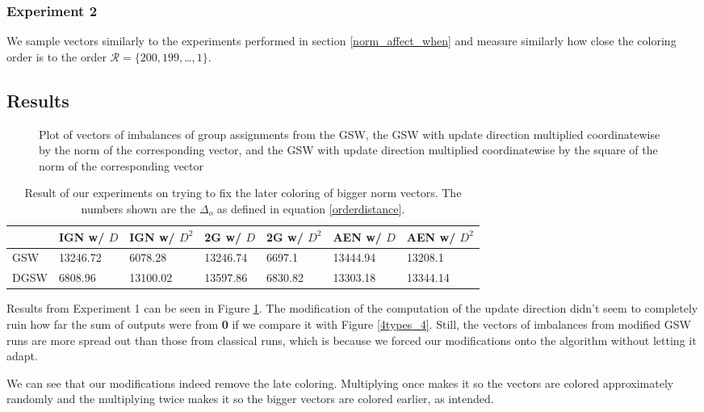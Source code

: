 \documentclass[12pt]{article}
\begin{document}
\subsubsection{Experiment 2}
We sample vectors similarly to the experiments performed in section \ref{norm_affect_when} and measure similarly how close the coloring order is to the order $\mathcal{R}=\{200,199,$\dots$,1\}$.
\subsection{Results}
\begin{figure}[h]

\caption{Plot of vectors of imbalances of group assignments from the GSW, the GSW with update direction multiplied coordinatewise by the norm of the corresponding vector, and the GSW with update direction multiplied coordinatewise by the square of the norm of the corresponding vector}\label{3_types_d_and_i}
\end{figure}

\begin{center}
\begin{table}[h]
\begin{tabular}{l|llllll}
 &IGN w/ $D$&IGN w/ $D^2$& 2G w/ $D$&2G w/ $D^2$& AEN w/ $D$&AEN w/ $D^2$   \\
\hline
GSW&13246.72&6078.28&13246.74&6697.1&13444.94&13208.1\\
DGSW&6808.96&13100.02&13597.86&6830.82&13303.18&13344.14
\end{tabular}
\caption{Result of our experiments on trying to fix the later coloring of bigger norm vectors. The numbers shown are the $\Delta_o$ as defined in equation \ref{orderdistance}.}
\label{norm_earlier}
\end{table}
\end{center}
Results from Experiment 1 can be seen in Figure \ref{3_types_d_and_i}. The modification of the computation of the update direction didn't seem to completely ruin how far the sum of outputs were from \textbf{0} if we compare it with Figure \ref{4types_4}. Still, the vectors of imbalances  from modified GSW runs are more spread out than those from classical runs, which is because we forced our modifications onto the algorithm without letting it adapt.

We can see that our modifications indeed remove the late coloring. Multiplying once makes it so the vectors are colored approximately randomly and the multiplying twice makes it so the bigger vectors are colored earlier, as intended. 
\end{document}
